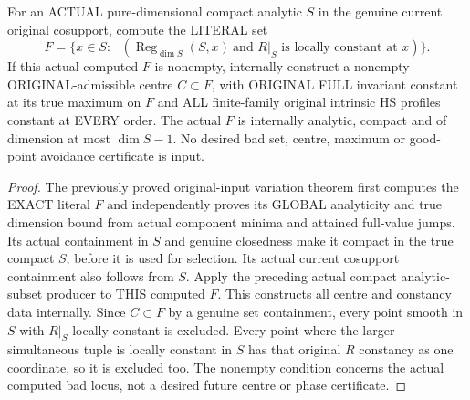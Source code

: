\begin{theorem}
\label{hir:original-actual-full-variation-simultaneous-first-centre}
\leanok
For an ACTUAL pure-dimensional compact analytic $S$ in the genuine current
original cosupport, compute the LITERAL set
\[
 F=\{x\in S:\neg(\operatorname{Reg}_{\dim S}(S,x)\ \text{and $R|_S$ is locally constant at }x)\}.
\]
If this actual computed $F$ is nonempty, internally construct a nonempty
ORIGINAL-admissible centre $C\subset F$, with ORIGINAL FULL invariant
constant at its true maximum on $F$ and ALL finite-family original intrinsic
HS profiles constant at EVERY order. The actual $F$ is internally analytic,
compact and of dimension at most $\dim S-1$. No desired bad set, centre,
maximum or good-point avoidance certificate is input.
\end{theorem}
\begin{proof}
The previously proved original-input variation theorem first computes the
EXACT literal $F$ and independently proves its GLOBAL analyticity and true
dimension bound from actual component minima and attained full-value jumps.
Its actual containment in $S$ and genuine closedness make it compact in the
true compact $S$, before it is used for selection. Its actual current
cosupport containment also follows from $S$. Apply the preceding actual
compact analytic-subset producer to THIS computed $F$. This constructs
all centre and constancy data internally. Since $C\subset F$ by a genuine
set containment, every point smooth in $S$ with $R|_S$ locally constant is
excluded. Every point where the larger simultaneous tuple is locally
constant in $S$ has that original $R$ constancy as one coordinate, so it is
excluded too. The nonempty condition concerns the actual computed bad
locus, not a desired future centre or phase certificate.
\end{proof}


